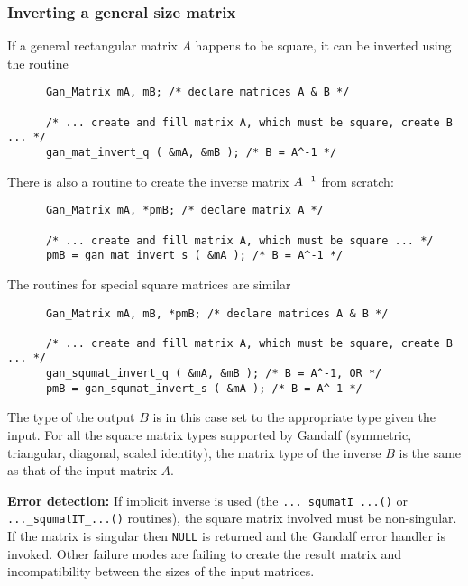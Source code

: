 \subsubsection{Inverting a general size matrix}
If a general rectangular matrix $A$ happens to be square, it can be
inverted using the routine
\begin{verbatim}
      Gan_Matrix mA, mB; /* declare matrices A & B */

      /* ... create and fill matrix A, which must be square, create B ... */
      gan_mat_invert_q ( &mA, &mB ); /* B = A^-1 */
\end{verbatim}
There is also a routine to create the inverse matrix $A^{-1}$ from scratch:
\begin{verbatim}
      Gan_Matrix mA, *pmB; /* declare matrix A */

      /* ... create and fill matrix A, which must be square ... */
      pmB = gan_mat_invert_s ( &mA ); /* B = A^-1 */
\end{verbatim}
The routines for special square matrices are similar
\begin{verbatim}
      Gan_Matrix mA, mB, *pmB; /* declare matrices A & B */

      /* ... create and fill matrix A, which must be square, create B ... */
      gan_squmat_invert_q ( &mA, &mB ); /* B = A^-1, OR */
      pmB = gan_squmat_invert_s ( &mA ); /* B = A^-1 */
\end{verbatim}
The type of the output $B$ is in this case set to the appropriate type given
the input. For all the square matrix types supported by Gandalf (symmetric,
triangular, diagonal, scaled identity), the matrix type of the inverse $B$
is the same as that of the input matrix $A$.

{\bf Error detection:} If implicit inverse is used (the
{\tt ...\_squmatI\_...()} or {\tt ...\_squmatIT\_...()} routines),
the square matrix involved must be non-singular. If the matrix is singular
then {\tt NULL} is returned and the Gandalf error handler is invoked.
Other failure modes are failing to create the result matrix and incompatibility
between the sizes of the input matrices.

